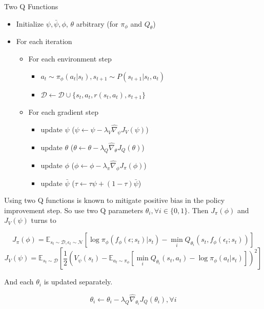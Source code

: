 \documentclass[8pt]{beamer}
\begin{document}
\begin{frame}{Two Q Functions}
    \begin{itemize}
        \item Initialize $\psi, \bar{\psi}, \phi$, $\theta$ arbitrary (for $\pi_\phi$ and $Q_\theta$)
        \item For each iteration
        \begin{itemize}
            \item For each environment step
            \begin{itemize}
                \item $a_t \sim \pi_\phi(a_t | s_t), s_{t+1} \sim P(s_{t+1}|s_t, a_t)$
                \item $\mathcal{D} \leftarrow \mathcal{D} \cup \{s_t, a_t, r(s_t, a_t), s_{t+1}\}$            
            \end{itemize}
            \item For each gradient step
            \begin{itemize}
                \item update $\psi$ (\( \psi \leftarrow \psi - \lambda_V \hat{\nabla}_\psi J_V (\psi) \))
                \item update $\theta$ (\( \theta \leftarrow \theta - \lambda_Q \hat{\nabla}_\theta J_Q (\theta)\))
                \item update $\phi$ (\(\phi \leftarrow \phi - \lambda_\pi \hat{\nabla}_\phi J_\pi(\phi)\))
                \item update $\bar{\psi}$ ($\tau \leftarrow \tau \psi + (1- \tau)\bar{\psi}$)
            \end{itemize}
        \end{itemize}
    \end{itemize}

    Using two Q functions is known to mitigate positive bias in the policy improvement step. So use two Q parameters $\theta_i, \forall i \in \{0, 1\}$. Then $J_\pi (\phi)$ and $J_V (\psi)$ turns to 


    \begin{equation*}
        J_\pi (\phi) = \mathbb{E}_{s_t \sim \mathcal{D}, \epsilon_t \sim \mathcal{N}} [\log{\pi_\phi (f_\phi (\epsilon; s_t)| s_t)} - \min_i Q_{\theta_i} (s_t, f_\phi(\epsilon_t ; s_t)) ]
    \end{equation*}
    \begin{equation*}
        J_V(\psi) = \mathbb{E}_{s_t \sim \mathcal{D}} \left[ \frac{1}{2} \left(V_\psi (s_t) - \mathbb{E}_{a_t \sim \pi_\phi}[\min_i Q_{\theta_i}(s_t, a_t) - \log{\pi_\phi (a_t | s_t)}]\right)^2 \right]
    \end{equation*}

    And each $\theta_i$ is updated separately.

    \[
    \theta_i \leftarrow \theta_i -  \lambda_Q \hat{\nabla}_{\theta_i} J_Q(\theta_i), \forall i
    \]

\end{frame}
\end{document}
